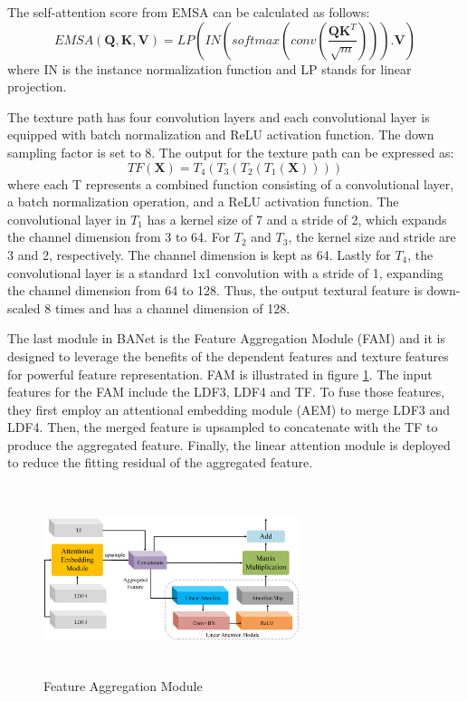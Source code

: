 The self-attention score from EMSA can be calculated as follows:
\begin{equation}
    EMSA(\mathbf{Q,K,V}) = LP(IN(softmax(conv(\frac{\mathbf{QK}^T}{\sqrt{m}}))).\mathbf{V})
\end{equation}
where IN is the instance normalization function and LP stands for linear projection.

The texture path has four convolution layers and each convolutional layer is equipped with batch normalization and ReLU activation function. The down sampling factor is set to 8. The output for the texture path can be expressed as:
\begin{equation}
    TF(\mathbf{X}) = T_4(T_3(T_2(T_1(\mathbf{X}))))
\end{equation}
where each T represents a combined function consisting of a convolutional layer, a batch
normalization operation, and a ReLU activation function. The convolutional layer in $T_1$ has a
kernel size of 7 and a stride of 2, which expands the channel dimension from 3 to 64. For
$T_2$ and $T_3$, the kernel size and stride are 3 and 2, respectively. The channel dimension is
kept as 64. Lastly for $T_4$, the convolutional layer is a standard 1x1 convolution with a stride of 1, expanding the channel dimension from 64 to 128. Thus, the output textural feature is
down-scaled 8 times and has a channel dimension of 128.

The last module in BANet is the Feature Aggregation Module (FAM) and it is designed to leverage the benefits of the dependent features and texture features for powerful feature representation. FAM is illustrated in figure \ref{fig:fam}. The input features for the FAM include the LDF3, LDF4 and TF. To fuse those features, they first employ an attentional embedding module (AEM) to merge LDF3 and LDF4. Then, the merged feature is upsampled to concatenate with the TF to produce the aggregated feature. Finally, the linear attention module is deployed to reduce the fitting residual of the aggregated feature.

\FloatBarrier
\begin{figure}[ht]
\includegraphics[width=7.5cm, height=5.5cm]{images/fam.jpg}
\centering
\caption{Feature Aggregation Module \protect\cite{banet}}
\label{fig:fam}
\end{figure}

